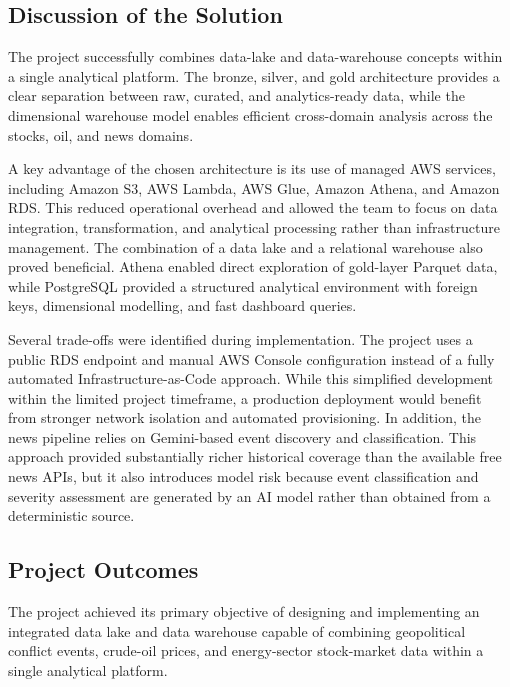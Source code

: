 \documentclass[11pt,a4paper]{article}
\begin{document}
\subsection{Discussion of the Solution}
\label{sec:discussion}

The project successfully combines data-lake and data-warehouse
concepts within a single analytical platform. The bronze, silver, and
gold architecture provides a clear separation between raw, curated,
and analytics-ready data, while the dimensional warehouse model
enables efficient cross-domain analysis across the stocks, oil, and
news domains.

A key advantage of the chosen architecture is its use of managed AWS
services, including Amazon S3, AWS Lambda, AWS Glue, Amazon Athena,
and Amazon RDS. This reduced operational overhead and allowed the
team to focus on data integration, transformation, and analytical
processing rather than infrastructure management. The combination of a
data lake and a relational warehouse also proved beneficial. Athena
enabled direct exploration of gold-layer Parquet data, while
PostgreSQL provided a structured analytical environment with foreign
keys, dimensional modelling, and fast dashboard queries.

Several trade-offs were identified during implementation. The project
uses a public RDS endpoint and manual AWS Console configuration
instead of a fully automated Infrastructure-as-Code approach. While
this simplified development within the limited project timeframe, a
production deployment would benefit from stronger network isolation
and automated provisioning. In addition, the news pipeline relies on
Gemini-based event discovery and classification. This approach
provided substantially richer historical coverage than the available
free news APIs, but it also introduces model risk because event
classification and severity assessment are generated by an AI model
rather than obtained from a deterministic source.

\subsection{Project Outcomes}
\label{sec:project_outcomes}

The project achieved its primary objective of designing and
implementing an integrated data lake and data warehouse capable of
combining geopolitical conflict events, crude-oil prices, and
energy-sector stock-market data within a single analytical platform.
\end{document}
